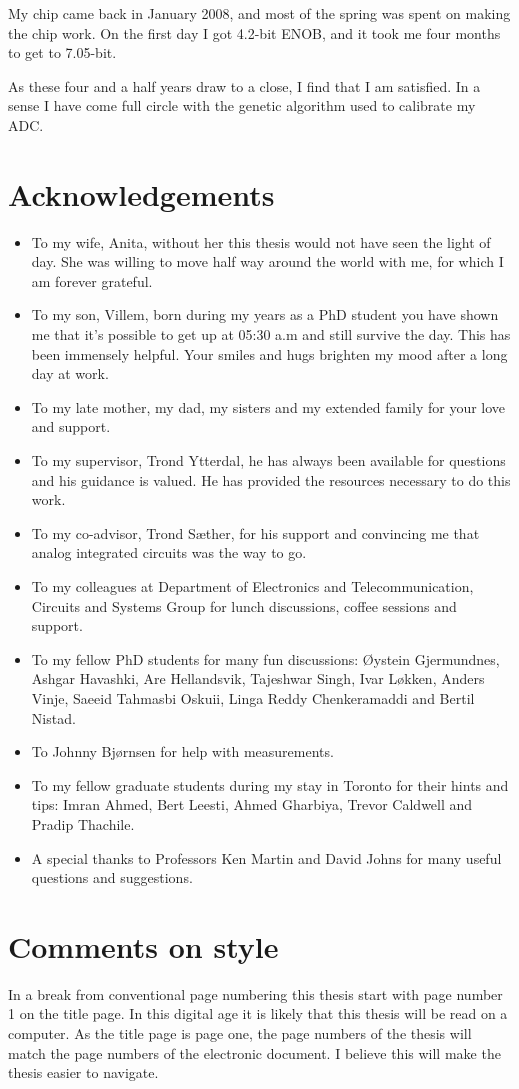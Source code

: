 My chip came back in January 2008, and most of the spring was spent on
making the chip work. On the first day I
got 4.2-bit ENOB, and it took me four months to get to 7.05-bit.

As these four and a half years draw to a close, I find that I am
satisfied. In a sense I have come full circle with the genetic
algorithm used to calibrate my ADC. 


\section*{Acknowledgements}
\begin{itemize}
\item To my wife, Anita, without her this thesis
would not have seen the light of day. She was willing to move half way
around the world with me, for which I am forever grateful. 
\item To my son, Villem, born during my years as a PhD student you have shown me that
  it's possible to get up at 05:30 {\sc a.m} and still
  survive the day. This has been immensely helpful. Your smiles and hugs
  brighten my mood after a long day at work.
\item To my late mother, my dad, my sisters and my extended family for
  your love and support.
\item To my supervisor, Trond Ytterdal, he has always been available
  for questions and his guidance is valued. He has provided the resources necessary to do this
  work.  
\item To my co-advisor, Trond S{\ae}ther, for his support and
  convincing me that analog integrated circuits was the way to go.
\item To my colleagues at Department of Electronics and
  Telecommunication, Circuits and Systems Group for lunch discussions,
  coffee sessions and support.
\item To my fellow PhD students for many
  fun discussions: {\O}ystein
  Gjermundnes, Ashgar Havashki, Are Hellandsvik, Tajeshwar Singh, Ivar
  L{\o}kken, Anders Vinje, Saeeid Tahmasbi Oskuii,
   Linga Reddy Chenkeramaddi and Bertil Nistad. 
\item To Johnny Bj{\o}rnsen for help with measurements.
\item To my fellow graduate students during my stay in Toronto for
  their hints and tips: Imran Ahmed, Bert Leesti, Ahmed Gharbiya,
  Trevor Caldwell and Pradip Thachile.
\item  A special thanks to Professors
  Ken Martin and David Johns for many useful questions and
  suggestions.  
\end{itemize}

\section*{Comments on style}
In a break from conventional page numbering this thesis start with
page number 1 on the title page. In this digital age it is likely that this
thesis will be read on a computer. As the title page is page one, the
page numbers of the thesis will match the page numbers of the electronic
document. I believe this will make the thesis easier to navigate.



